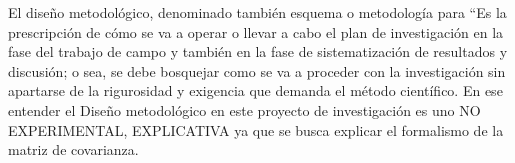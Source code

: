 \documentclass[../Main.tex]{subfiles}
\begin{document}
El diseño metodológico, denominado también esquema o metodología para “Es la prescripción de cómo se va a operar o llevar a cabo el plan de investigación en la fase del trabajo de campo y también en la fase de sistematización de resultados y discusión; o sea, se debe bosquejar como se va a proceder con la investigación sin apartarse de la rigurosidad y exigencia que demanda el método científico. En ese entender el Diseño metodológico en este proyecto de investigación es uno NO EXPERIMENTAL, EXPLICATIVA ya que se busca explicar el formalismo de la matriz de covarianza.
\biblio %
\end{document}

